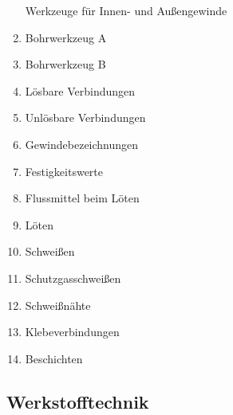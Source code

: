 \begin{enumerate}
  Werkzeuge für Innen- und Außengewinde\\
\item
  Bohrwerkzeug A\\
\item
  Bohrwerkzeug B\\
\item
  Lösbare Verbindungen\\
\item
  Unlösbare Verbindungen\\
\item
  Gewindebezeichnungen\\
\item
  Festigkeitswerte\\
\item
  Flussmittel beim Löten\\
\item
  Löten\\
\item
  Schweißen\\
\item
  Schutzgasschweißen\\
\item
  Schweißnähte\\
\item
  Klebeverbindungen\\
\item
  Beschichten
\end{enumerate}

\subsection{Werkstofftechnik}\label{werkstofftechnik}

